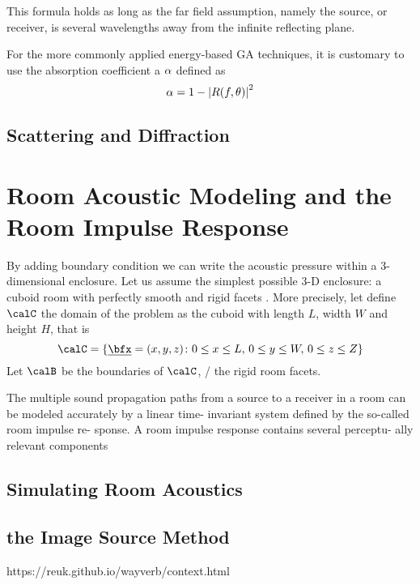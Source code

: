 This formula holds as long as the far field assumption, namely the source, or receiver, is several wavelengths away from the infinite reflecting plane.

For the more commonly applied energy-based GA techniques,
it is customary to use the absorption coefficient a $\alpha$ defined as
\begin{equation}
    \absCoeff = 1 - \abs{R(f, \theta)}^2
\end{equation}






\subsection{Scattering and Diffraction}

\section{Room Acoustic Modeling and the Room Impulse Response}
By adding boundary condition we can write the acoustic pressure within a 3-dimensional enclosure.
Let us assume the simplest possible 3-D enclosure: a cuboid room with perfectly smooth and rigid facets
.
More precisely, let define $\calC$ the domain of the problem as the cuboid with length $L$, width $W$ and height $H$, that is
\begin{equation}
    \calC = \kset{\positionMicrophone = (x,y,z)}{
        0 \le x \le L,\,
        0 \le y \le W,\,
        0 \le z \le Z}
\end{equation}
Let $\calB$ be the boundaries of $\calC$, \ie/ the rigid room facets.

The multiple sound propagation paths from a source to a
receiver in a room can be modeled accurately by a linear time- invariant system defined by the so-called room impulse re- sponse. A room impulse response contains several perceptu- ally relevant components


\subsection{Simulating Room Acoustics}


\subsection{the Image Source Method}
https://reuk.github.io/wayverb/context.html

